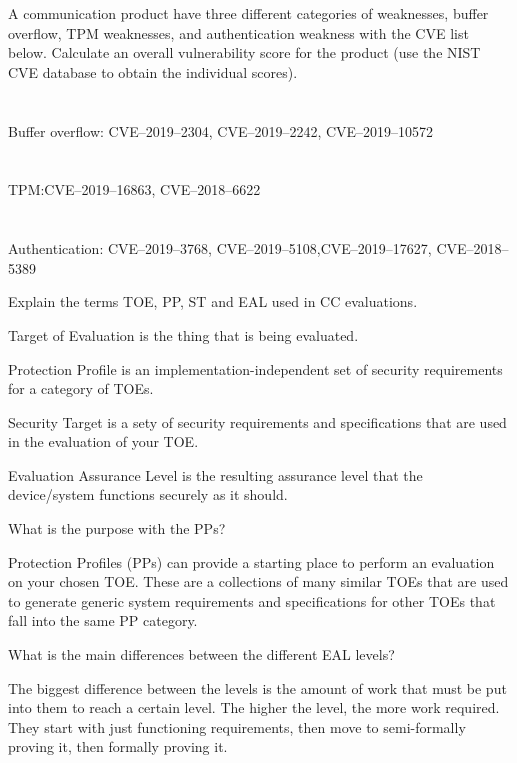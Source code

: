 \begin{questions}
\question{} A communication product have three different categories of weaknesses, buffer overflow, TPM weaknesses, and authentication weakness with the CVE list below. Calculate an overall vulnerability score for the product (use the NIST CVE database to obtain the individual scores).
  \begin{parts}
  \part{} Buffer overflow: CVE--2019--2304, CVE--2019--2242, CVE--2019--10572
  \part{} TPM:\@ CVE--2019--16863, CVE--2018--6622
  \part{} Authentication: CVE--2019--3768, CVE--2019--5108,CVE--2019--17627, CVE--2018--5389
  \end{parts}

\question{} Explain the terms TOE, PP, ST and EAL used in CC evaluations.
  \begin{solution}
    \begin{description}[noitemsep]
    \item[TOE] Target of Evaluation is the thing that is being evaluated.
    \item[PP] Protection Profile is an implementation-independent set of security requirements for a category of TOEs.
    \item[ST] Security Target is a sety of security requirements and specifications that are used in the evaluation of your TOE.\@
    \item[EAL] Evaluation Assurance Level is the resulting assurance level that the device/system functions securely as it should.
    \end{description}
  \end{solution}

\question{} What is the purpose with the PPs?
  \begin{solution}
    Protection Profiles (PPs) can provide a starting place to perform an evaluation on your chosen TOE.\@
    These are a collections of many similar TOEs that are used to generate generic system requirements and specifications for other TOEs that fall into the same PP category.
  \end{solution}

\question{} What is the main differences between the different EAL levels?
  \begin{solution}
    The biggest difference between the levels is the amount of work that must be put into them to reach a certain level.
    The higher the level, the more work required.
    They start with just functioning requirements, then move to semi-formally proving it, then formally proving it.
  \end{solution}
\end{questions}


